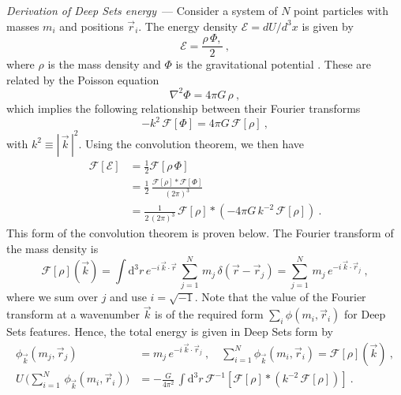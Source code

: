 \documentclass[10pt]{article}
\renewcommand{\paragraph}[1]{\par\addvspace{1.5ex}\noindent\textsl{#1}~---}
\renewcommand{\d}{\mathrm{d}}
\newcommand{\abs}[1]{|\,{#1}\,|}
\begin{document}
\paragraph{Derivation of Deep Sets energy} Consider a system of $N$ point particles with masses $m_i$ and positions $\vec{r}_i$.
The energy density $\mathcal{E} = d U / d^3 x$ is given by
\begin{equation}
    \mathcal{E} = \frac{\rho \, \Phi,}{2}~,
\end{equation}
where $\rho$ is the mass density and $\Phi$ is the gravitational potential \citep{LandauLifshitzFields}.
These are related by the Poisson equation
\begin{equation}
    \nabla^2 \Phi = 4 \pi G \, \rho~,
\end{equation}
which implies the following relationship between their Fourier transforms
\begin{equation}
    -k^2 \, \mathcal{F}[\Phi] = 4 \pi G \, \mathcal{F}[\rho]~,
\end{equation}
with $k^2 \equiv \abs{\vec{k}}^2$.
Using the convolution theorem, we then have
\begin{align}
    \mathcal{F}[\mathcal{E}] 
    &= \frac{1}{2} \mathcal{F}[\rho \, \Phi] \nonumber\\
    &= \frac{1}{2} \, \frac{\mathcal{F}[\rho] \ast \mathcal{F}[\Phi]}{(2\pi)^3} \nonumber\\
    &= \frac{1}{2 \, (2\pi)^3} \, \mathcal{F}[\rho] \ast \left(
        -4 \pi G \, k^{-2} \, \mathcal{F}[\rho]
    \right)~.
    \label{eq:ConvolutionThm}
\end{align}
This form of the convolution theorem is proven below.
The Fourier transform of the mass density is
\begin{equation}
    \mathcal{F}[\rho](\vec{k})
    = \int \d^3 r
        \, e^{-i \, \vec{k} \cdot \vec{r}}
        \, \sum_{j=1}^{N}
        \, m_j
        \, \delta(\vec{r} - \vec{r}_j)
    = \sum_{j=1}^{N} \, m_j \, e^{-i \, \vec{k} \cdot \vec{r}_j}~,
\end{equation}
where we sum over $j$ and use $i=\sqrt{-1}$.
Note that the value of the Fourier transform at a wavenumber $\vec{k}$ is of the required form $\sum_i \phi(m_i, \vec{r}_i)$ for Deep Sets features.
Hence, the total energy is given in Deep Sets form by
\begin{align}
    \phi_{\vec{k}}(m_j, \vec{r}_j)
    &=m_j \, e^{-i \, \vec{k} \cdot \vec{r}_j}
    ~,
    \quad
    \sum_{i=1}^{N} \phi_{\vec{k}}(m_i, \vec{r}_i)
    = \mathcal{F}[\rho](\vec{k})~,
    \nonumber\\
    U \, \big( \sum_{i=1}^{N} \, \phi_{\vec{k}}(m_i, \vec{r}_i) \big)
    &= -\frac{G}{4 \pi^2} \,
        \int \d^3 r \,
        \mathcal{F}^{-1} \left[
            \mathcal{F}[\rho] \ast \left(
            k^{-2} \, \mathcal{F}[\rho] \right)
        \right]~.
\end{align}
\end{document}
